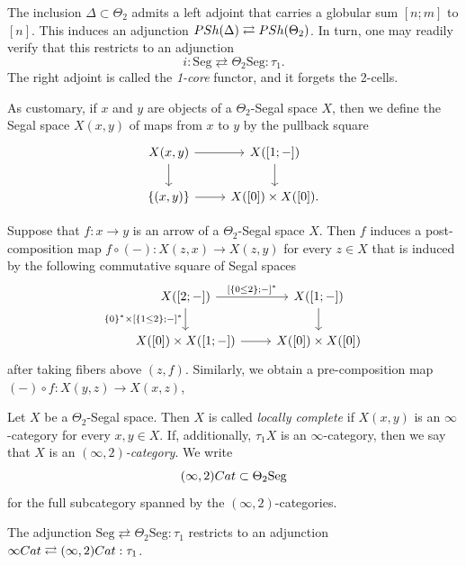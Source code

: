 \documentclass[a4paper, 11pt]{amsart}
\numberwithin{theorem}{section}
\theoremstyle{definition}
\newcommand{\cat}[1]{\textup{#1}}
\newcommand{\Cat}{\cat{Cat}}
\newcommand{\Seg}{\mathrm{Seg}}
\newcommand{\PSh}{\cat{PSh}}
\begin{document}
\begin{construction}
	The inclusion $\Delta \subset \Theta_2$ admits a left adjoint that carries a globular sum $[n;m]$ to $[n]$. 
	This induces an adjunction $\PSh(\Delta) \rightleftarrows \PSh(\Theta_2)$. In turn, one may readily verify that this restricts to an adjunction
	$$
		i : \Seg \rightleftarrows \Theta_2\Seg : \tau_1.
	$$ 
	The right adjoint is called the \textit{1-core} functor, and it forgets the 2-cells.
\end{construction}

\begin{definition}
	As customary, if $x$ and $y$ are objects of a $\Theta_2$-Segal space $X$, then we define the Segal space $X(x,y)$ 
	of maps from $x$ to $y$ by the pullback square
	\[
		\begin{tikzcd}
			X(x,y)\arrow[d] \arrow[r] & X([1; -]) \arrow[d] \\
			\{(x,y)\} \arrow[r] & X([0]) \times X([0]).
		\end{tikzcd}
	\]
\end{definition}

\begin{remark}
	Suppose that $f : x \to y$ is an arrow of a $\Theta_2$-Segal space $X$. Then $f$ induces a post-composition map 
	$f \circ (-): X(z,x) \to X(z,y)$ for every $z \in X$ that is induced by the following commutative square 
	of Segal spaces
	\[
		\begin{tikzcd}
			X([2;-]) \arrow[r, "{[\{0\leq 2\}; -]^*}"]\arrow[d, "{\{0\}^* \times [\{1\leq 2\}; -]^*}"'] & X([1;-]) \arrow[d] \\
			X([0]) \times X([1;-])\arrow[r] & X([0]) \times X([0])
		\end{tikzcd}
	\]
	after taking fibers above $(z,f)$.
	Similarly, we obtain a pre-composition map $(-) \circ f : X(y,z) \to X(x,z)$,
\end{remark}

\begin{definition}
	Let $X$ be a $\Theta_2$-Segal space. Then $X$ is called \textit{locally complete} if $X(x,y)$ is an $\infty$-category for 
	every $x,y \in X$. If, additionally, $\tau_1 X$ is an $\infty$-category, then we say that $X$ is an \textit{$(\infty,2)$-category}.
	We write
	$$(\infty,2)\Cat \subset \Theta_2\Seg$$ 
	for the full subcategory spanned by the $(\infty,2)$-categories.
\end{definition}

\begin{remark}
	The adjunction $\Seg \rightleftarrows \Theta_2\Seg : \tau_1$ restricts to an adjunction 
	$\infty\Cat \rightleftarrows (\infty,2)\Cat: \tau_1$.
\end{remark}
\end{document}
